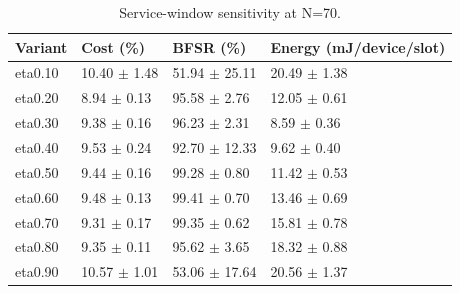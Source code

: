 \begin{table}[t]
\centering
\caption{Service-window sensitivity at N=70.}
\label{tab:eta_sensitivity}
\begin{tabular}{llll}
\toprule
Variant & Cost (\%) & BFSR (\%) & Energy (mJ/device/slot) \\
\midrule
eta0.10 & 10.40 $\pm$ 1.48 & 51.94 $\pm$ 25.11 & 20.49 $\pm$ 1.38 \\
eta0.20 & 8.94 $\pm$ 0.13 & 95.58 $\pm$ 2.76 & 12.05 $\pm$ 0.61 \\
eta0.30 & 9.38 $\pm$ 0.16 & 96.23 $\pm$ 2.31 & 8.59 $\pm$ 0.36 \\
eta0.40 & 9.53 $\pm$ 0.24 & 92.70 $\pm$ 12.33 & 9.62 $\pm$ 0.40 \\
eta0.50 & 9.44 $\pm$ 0.16 & 99.28 $\pm$ 0.80 & 11.42 $\pm$ 0.53 \\
eta0.60 & 9.48 $\pm$ 0.13 & 99.41 $\pm$ 0.70 & 13.46 $\pm$ 0.69 \\
eta0.70 & 9.31 $\pm$ 0.17 & 99.35 $\pm$ 0.62 & 15.81 $\pm$ 0.78 \\
eta0.80 & 9.35 $\pm$ 0.11 & 95.62 $\pm$ 3.65 & 18.32 $\pm$ 0.88 \\
eta0.90 & 10.57 $\pm$ 1.01 & 53.06 $\pm$ 17.64 & 20.56 $\pm$ 1.37 \\
\bottomrule
\end{tabular}
\end{table}
